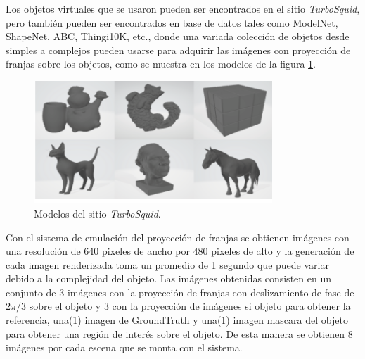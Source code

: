 \documentclass[10pt,letterpaper]{article}
\begin{document}
Los objetos virtuales que se usaron pueden ser encontrados en el sitio \textit{TurboSquid}, pero también pueden ser encontrados en base de datos  \cite{Wang:Wang} tales como ModelNet, ShapeNet, ABC, Thingi10K, etc., donde una variada colección de objetos desde simples a complejos pueden usarse para adquirir las imágenes con proyección de franjas sobre los objetos, como se muestra en los modelos de la figura \ref{tif3}.  %

\begin{figure}[H]
	\centering
    \includegraphics[width=0.8\textwidth]{tifs/tif3.png}
    \caption{Modelos del sitio \textit{TurboSquid}.}
    \label{tif3}
\end{figure}

Con el sistema de emulación del proyección de franjas se obtienen imágenes con una resolución de 640 pixeles de ancho por 480 pixeles de alto y la generación de cada imagen renderizada toma un promedio de 1 segundo que puede variar debido a la complejidad del objeto. Las imágenes obtenidas consisten en un conjunto de 3 imágenes con la proyección de franjas con deslizamiento de fase de $2\pi/3$ sobre el objeto y 3 con la proyección de imágenes si objeto para obtener la referencia, una(1) imagen de GroundTruth y una(1) imagen mascara del objeto para obtener una región de interés sobre el objeto. De esta manera se obtienen 8 imágenes por cada escena que se monta con el sistema.
\end{document}
